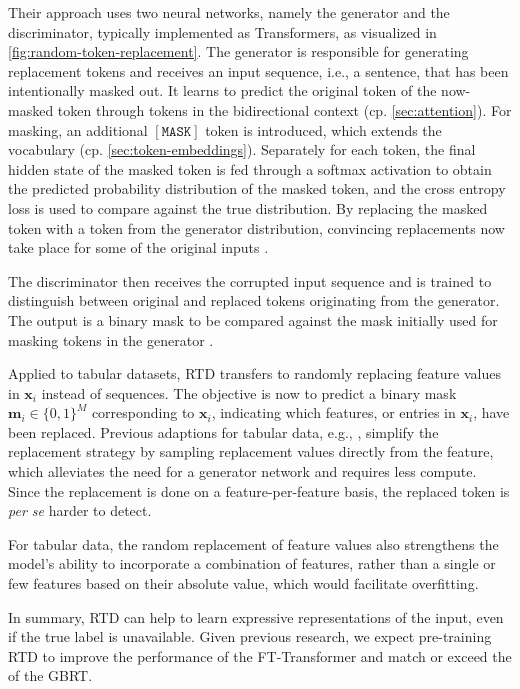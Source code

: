Their approach uses two neural networks, namely the generator and the discriminator, typically implemented as Transformers, as visualized in \cref{fig:random-token-replacement}.  The generator is responsible for generating replacement tokens and receives an input sequence, i.e., a sentence, that has been intentionally masked out. It learns to predict the original token of the now-masked token through tokens in the bidirectional context (cp. \cref{sec:attention}). For masking, an additional $\mathtt{[MASK]}$ token is introduced, which extends the vocabulary (cp. \cref{sec:token-embeddings}). Separately for each token, the final hidden state of the masked token is fed through a softmax activation to obtain the predicted probability distribution of the masked token, and the cross entropy loss is used to compare against the true distribution. By replacing the masked token with a token from the generator distribution, convincing replacements now take place for some of the original inputs \autocite[][2--3]{clarkElectraPretrainingText2020}.

The discriminator then receives the corrupted input sequence and is trained to distinguish between original and replaced tokens originating from the generator. The output is a binary mask to be compared against the mask initially used for masking tokens in the generator \autocite[][2--3]{clarkElectraPretrainingText2020}.

Applied to tabular datasets, \gls{RTD} transfers to randomly replacing feature values in $\mathbf{x}_{i}$ instead of sequences. The objective is now to predict a binary mask $\mathbf{m}_{i}\in \{0,1\}^{M}$ corresponding to $\mathbf{x}_{i}$, indicating which features, or entries in $\mathbf{x}_{i}$, have been replaced. Previous adaptions for tabular data, e.g., \textcite[][3]{huangTabTransformerTabularData2020}, simplify the replacement strategy by sampling replacement values directly from the feature, which alleviates the need for a generator network and requires less compute. Since the replacement is done on a feature-per-feature basis, the replaced token is \emph{per se} harder to detect.

For tabular data, the random replacement of feature values also strengthens the model's ability to incorporate a combination of features, rather than a single or few features based on their absolute value, which would facilitate overfitting.

In summary, \gls{RTD} can help to learn expressive representations of the input, even if the true label is unavailable. Given previous research, we expect pre-training \gls{RTD} to improve the performance of the FT-Transformer and match or exceed the of the \gls{GBRT}.